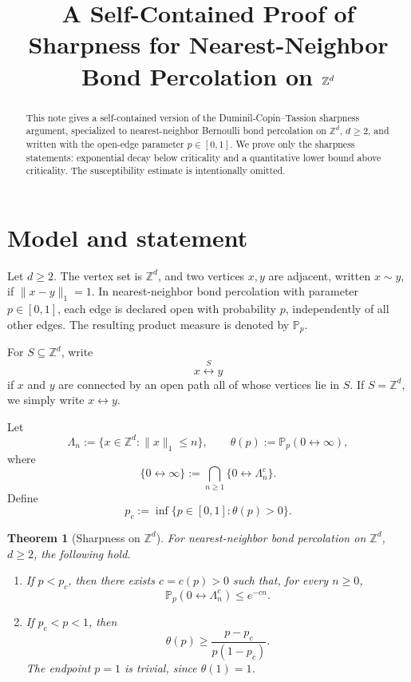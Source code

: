 \documentclass[11pt]{article}
\title{A Self-Contained Proof of Sharpness for Nearest-Neighbor Bond Percolation on $\Z^d$}
\author{}
\date{}
\newtheorem{theorem}{Theorem}
\newcommand{\Z}{\mathbb Z}
\newcommand{\Pp}{\mathbb P_p}
\newcommand{\conn}{\longleftrightarrow}
\begin{document}
\maketitle

\begin{abstract}
This note gives a self-contained version of the Duminil-Copin--Tassion sharpness argument, specialized to nearest-neighbor Bernoulli bond percolation on $\Z^d$, $d\ge 2$, and written with the open-edge parameter $p\in[0,1]$. We prove only the sharpness statements: exponential decay below criticality and a quantitative lower bound above criticality. The susceptibility estimate is intentionally omitted.
\end{abstract}

\section{Model and statement}

Let $d\ge 2$. The vertex set is $\Z^d$, and two vertices $x,y$ are adjacent, written $x\sim y$, if $\|x-y\|_1=1$. In nearest-neighbor bond percolation with parameter $p\in[0,1]$, each edge is declared open with probability $p$, independently of all other edges. The resulting product measure is denoted by $\Pp$.

For $S\subseteq \Z^d$, write
\[
 x \stackrel{S}{\conn} y
\]
if $x$ and $y$ are connected by an open path all of whose vertices lie in $S$. If $S=\Z^d$, we simply write $x\conn y$.

Let
\[
 \Lambda_n:=\{x\in\Z^d:\|x\|_1\le n\},
 \qquad
 \theta(p):=\Pp(0\conn\infty),
\]
where
\[
 \{0\conn\infty\}:=\bigcap_{n\ge 1}\{0\conn \Lambda_n^c\}.
\]
Define
\[
 p_c:=\inf\{p\in[0,1]:\theta(p)>0\}.
\]

\begin{theorem}[Sharpness on $\Z^d$]
For nearest-neighbor bond percolation on $\Z^d$, $d\ge 2$, the following hold.
\begin{enumerate}[label=(\roman*)]
\item If $p<p_c$, then there exists $c=c(p)>0$ such that, for every $n\ge 0$,
\[
 \Pp(0\conn \Lambda_n^c)\le e^{-c n}.
\]
\item If $p_c<p<1$, then
\[
 \theta(p)\ge \frac{p-p_c}{p(1-p_c)}.
\]
The endpoint $p=1$ is trivial, since $\theta(1)=1$.
\end{enumerate}
\end{theorem}
\end{document}
